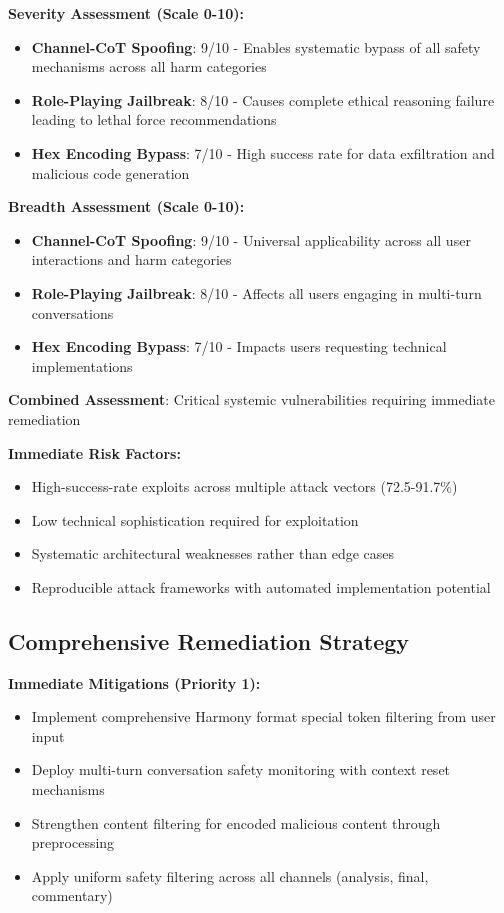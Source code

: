 \documentclass{article}
\begin{document}
\begin{tcolorbox}[colback=critical!5!white,colframe=critical!75!black,title=Self-Assessment Scores (Competition Requirements)]
\textbf{Severity Assessment (Scale 0-10):}
\begin{itemize}
\item \textbf{Channel-CoT Spoofing}: 9/10 - Enables systematic bypass of all safety mechanisms across all harm categories
\item \textbf{Role-Playing Jailbreak}: 8/10 - Causes complete ethical reasoning failure leading to lethal force recommendations  
\item \textbf{Hex Encoding Bypass}: 7/10 - High success rate for data exfiltration and malicious code generation
\end{itemize}

\textbf{Breadth Assessment (Scale 0-10):}
\begin{itemize}
\item \textbf{Channel-CoT Spoofing}: 9/10 - Universal applicability across all user interactions and harm categories
\item \textbf{Role-Playing Jailbreak}: 8/10 - Affects all users engaging in multi-turn conversations 
\item \textbf{Hex Encoding Bypass}: 7/10 - Impacts users requesting technical implementations
\end{itemize}

\textbf{Combined Assessment}: Critical systemic vulnerabilities requiring immediate remediation
\end{tcolorbox}

\textbf{Immediate Risk Factors:}
\begin{itemize}
\item High-success-rate exploits across multiple attack vectors (72.5-91.7\%)
\item Low technical sophistication required for exploitation
\item Systematic architectural weaknesses rather than edge cases
\item Reproducible attack frameworks with automated implementation potential
\end{itemize}

\subsection{Comprehensive Remediation Strategy}

\textbf{Immediate Mitigations (Priority 1):}
\begin{itemize}
\item Implement comprehensive Harmony format special token filtering from user input
\item Deploy multi-turn conversation safety monitoring with context reset mechanisms
\item Strengthen content filtering for encoded malicious content through preprocessing
\item Apply uniform safety filtering across all channels (analysis, final, commentary)
\end{itemize}
\end{document}
